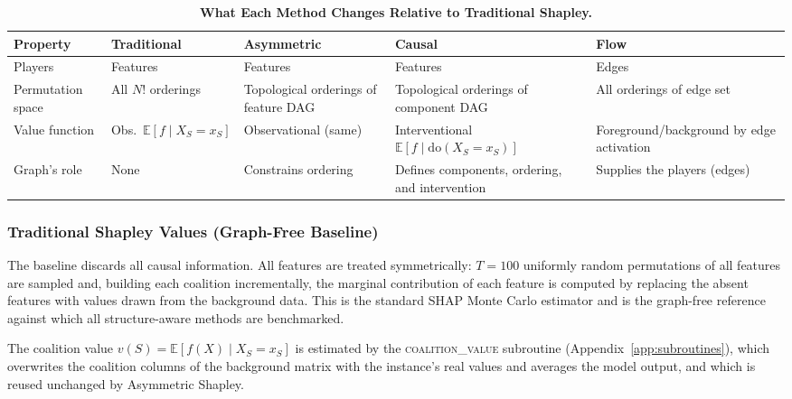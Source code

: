 \documentclass[12pt,a4paper,oneside]{article}
\begin{document}
\begin{table}[H]
  \centering
  \caption{\textbf{What Each Method Changes Relative to Traditional Shapley.}}
  \label{tab:method_comparison}
  \footnotesize
  \begin{tabularx}{\textwidth}{p{2.6cm}XXXX}
    \toprule
    \textbf{Property} & \textbf{Traditional} & \textbf{Asymmetric} & \textbf{Causal} & \textbf{Flow} \\
    \midrule
    Players & Features & Features & Features & Edges \\
    \midrule
    Permutation space & All $N!$ orderings & Topological orderings of feature DAG & Topological orderings of component DAG & All orderings of edge set \\
    \midrule
    Value function & Obs.\ $\mathbb{E}[f \mid X_S{=}x_S]$ & Observational (same) & Interventional $\mathbb{E}[f \mid \mathrm{do}(X_S{=}x_S)]$ & Foreground/background by edge activation \\
    \midrule
    Graph's role & None & Constrains ordering & Defines components, ordering, and intervention & Supplies the players (edges) \\
    \bottomrule
  \end{tabularx}
\end{table}

\subsubsection{Traditional Shapley Values (Graph-Free Baseline)}

The baseline discards all causal information. All features are treated symmetrically: $T = 100$ uniformly random permutations of all features are sampled and, building each coalition incrementally, the marginal contribution of each feature is computed by replacing the absent features with values drawn from the background data. This is the standard SHAP Monte Carlo estimator \citep{Lundberg2017} and is the graph-free reference against which all structure-aware methods are benchmarked.

The coalition value $v(S) = \mathbb{E}[f(X) \mid X_S = x_S]$ is estimated by the \textsc{coalition\_value} subroutine (Appendix~\ref{app:subroutines}), which overwrites the coalition columns of the background matrix with the instance's real values and averages the model output, and which is reused unchanged by Asymmetric Shapley.
\end{document}
